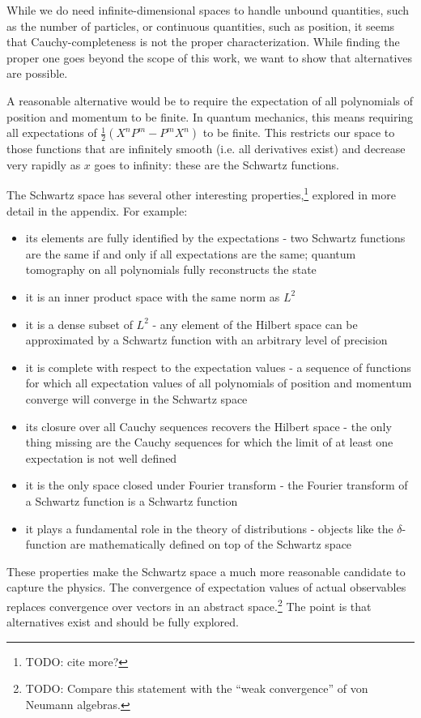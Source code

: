 \documentclass[10pt,twocolumn, nofootinbib]{revtex4-2}
\begin{document}
While we do need infinite-dimensional spaces to handle unbound quantities, such as the number of particles, or continuous quantities, such as position, it seems that Cauchy-completeness is not the proper characterization. While finding the proper one goes beyond the scope of this work, we want to show that alternatives are possible.

A reasonable alternative would be to require the expectation of all polynomials of position and momentum to be finite. In quantum mechanics, this means requiring all expectations of $\frac{1}{2}(X^nP^m - P^mX^n)$ to be finite. This restricts our space to those functions that are infinitely smooth (i.e. all derivatives exist) and decrease very rapidly as $x$ goes to infinity: these are the Schwartz functions.

The Schwartz space has several other interesting properties,\cite{moretti_spectral_2017}\footnote{TODO: cite more?} explored in more detail in the appendix. For example:

\begin{itemize}
\item its elements are fully identified by the expectations - two Schwartz functions are the same if and only if all expectations are the same; quantum tomography on all polynomials fully reconstructs the state
\item it is an inner product space with the same norm as $L^2$
\item it is a dense subset of $L^2$ - any element of the Hilbert space can be approximated by a Schwartz function with an arbitrary level of precision
\item it is complete with respect to the expectation values - a sequence of functions for which all expectation values of all polynomials of position and momentum converge will converge in the Schwartz space
\item its closure over all Cauchy sequences recovers the Hilbert space - the only thing missing are the Cauchy sequences for which the limit of at least one expectation is not well defined
\item it is the only space closed under Fourier transform - the Fourier transform of a Schwartz function is a Schwartz function
\item it plays a fundamental role in the theory of distributions - objects like the $\delta$-function are mathematically defined on top of the Schwartz space
\end{itemize}
These properties make the Schwartz space a much more reasonable candidate to capture the physics. The convergence of expectation values of actual observables replaces convergence over vectors in an abstract space.\footnote{TODO: Compare this statement with the ``weak convergence'' of von Neumann algebras.} The point is that alternatives exist and should be fully explored.
\end{document}
